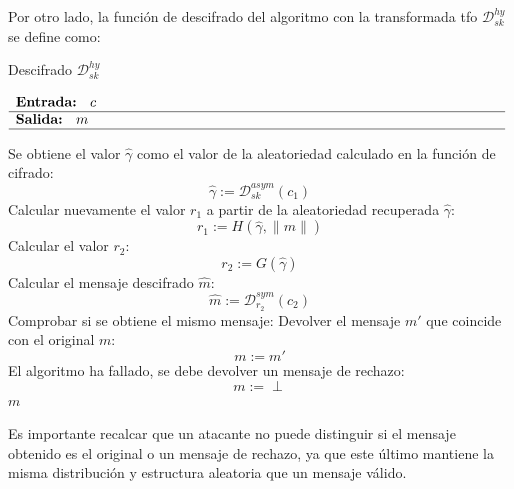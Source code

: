 Por otro lado, la función de descifrado del algoritmo con la transformada \acrshort{tfo} \(\mathcal{D}^{hy}_{sk}\) se define como:
\begin{algorithm}[H]
	\caption{Descifrado $\mathcal{D}^{hy}_{sk}$} 
	$\begin{array}{p{\textwidth}}
		\textbf{Entrada: } \(c\)\\ 
		\hline
		\textbf{Salida: } \(m\)\\ 
		\hline
	\end{array}$
	\begin{algorithmic}[1]
		\State Se obtiene el valor \(\hat{\gamma}\) como el valor de la aleatoriedad calculado en la función de cifrado:
		\begin{equation}
			\hat{\gamma}:=\mathcal{D}^{asym}_{sk}(c_1)
		\end{equation}
		\State Calcular nuevamente el valor \(r_1\) a partir de la aleatoriedad recuperada \(\hat{\gamma}\):
		\begin{equation}
			r_1:=H(\hat{\gamma},\|m\|)
		\end{equation}
		\State Calcular el valor \(r_2\):
		\begin{equation}
			r_2:=G(\hat{\gamma})
		\end{equation}
		\State Calcular el mensaje descifrado \(\hat{m}\):
		\begin{equation}
			\hat{m}:=\mathcal{D}^{sym}_{r_2}(c_2)
		\end{equation}
		\State Comprobar si se obtiene el mismo mensaje:
			\State Devolver el mensaje \(m'\) que coincide con el original \(m\):
			\begin{equation}
				m:=m'
			\end{equation}
		\Else
		\State El algoritmo ha fallado, se debe devolver un mensaje de rechazo:
		\begin{equation}
			m:=\perp
		\end{equation}
		\EndIf
		\State \Return \(m\)
	\end{algorithmic}
\end{algorithm}

Es importante recalcar que un atacante no puede distinguir si el mensaje obtenido es el original o un mensaje de rechazo, ya que este último mantiene la misma distribución y estructura aleatoria que un mensaje válido.
\newline

